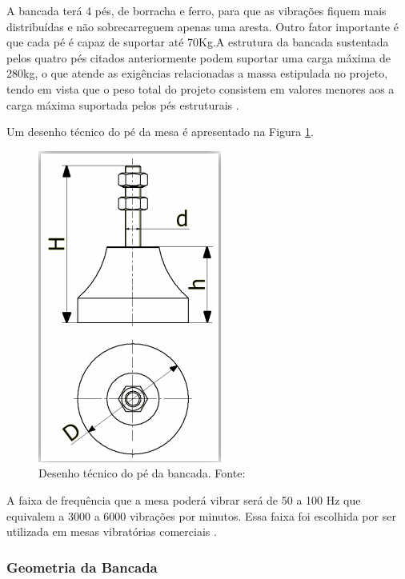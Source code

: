     A bancada terá 4 pés, de borracha e ferro, para que as vibrações fiquem mais distribuídas e não sobrecarreguem apenas uma aresta. Outro fator importante é que cada pé é capaz de suportar até 70Kg.A estrutura da bancada sustentada pelos quatro pés citados anteriormente podem suportar uma carga máxima de 280kg, o que atende as exigências relacionadas a massa estipulada no projeto, tendo em vista que o peso total do projeto consistem em valores menores aos a carga máxima suportada pelos pés estruturais \cite{ferramentas_kennedy}.

    Um desenho técnico do pé da mesa é apresentado na Figura \ref{fig:pe_bancada}.

    \begin{figure}[H]
      \centering
      \includegraphics[scale=0.5]{figuras/amortecedor.png}
      \caption{Desenho técnico do pé da bancada. Fonte: \cite{mola_catalogo}}
      \label{fig:pe_bancada}
      \end{figure}


A faixa de frequência que a mesa poderá vibrar será de 50 a 100 Hz que equivalem a 3000 a 6000 vibrações por minutos. Essa faixa foi escolhida por ser utilizada em mesas vibratórias comerciais \cite{ricardo_jose}.

\subsubsection*{\textbf{Geometria da Bancada}}


